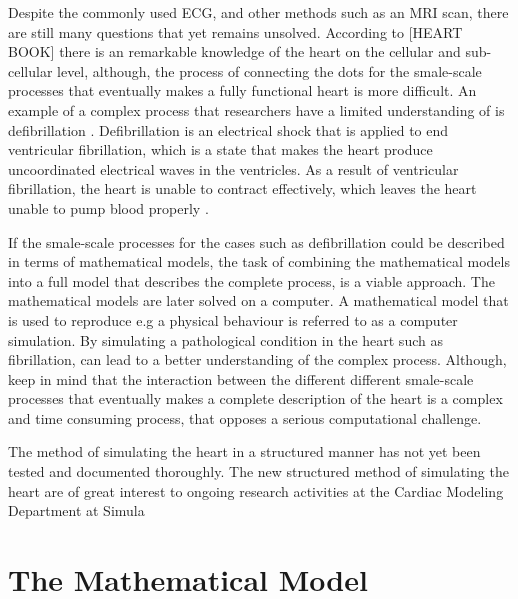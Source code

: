 Despite the commonly used ECG, and other methods such as an MRI scan, there are still many questions that yet remains unsolved. According to [HEART BOOK] there is an remarkable knowledge of the heart on the cellular and sub-cellular level, although, the process of connecting the dots for the smale-scale processes that eventually makes a fully functional heart is more difficult. An example of a complex process that researchers have a limited understanding of is defibrillation \cite{article24}. Defibrillation is an electrical shock that is applied to end ventricular fibrillation, which is a state that makes the heart produce uncoordinated electrical waves in the ventricles. As a result of ventricular fibrillation, the heart is unable to contract effectively, which leaves the heart unable to pump blood properly \cite{article24}. 

If the smale-scale processes for the cases such as defibrillation could be described in terms of mathematical models, the task of combining the mathematical models into a full model that describes the complete process, is a viable approach. The mathematical models are later solved on a computer. A mathematical model that is used to reproduce e.g a physical behaviour is referred to as a computer simulation. By simulating a pathological condition in the heart such as fibrillation, can lead to a better understanding of the complex process.  Although, keep in mind that the interaction between the different different smale-scale processes that eventually makes a complete description of the heart is a complex and time consuming process, that opposes a serious computational challenge.

The method of simulating the heart in a structured manner has not yet been tested and documented thoroughly. The new structured method of simulating the heart are of great interest to ongoing research activities at the Cardiac Modeling Department at Simula 

\section{The Mathematical Model}
